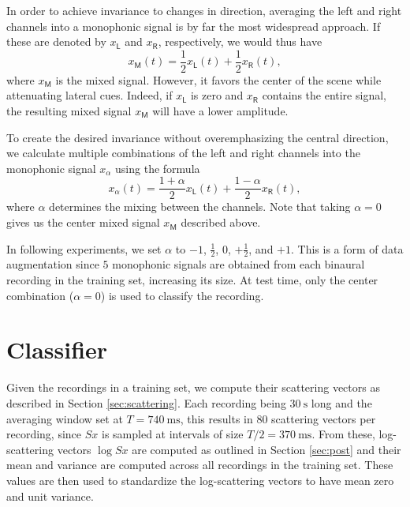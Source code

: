 \documentclass{article}
\begin{document}
\begin{sloppy}
In order to achieve invariance to changes in direction, averaging the left and right channels into a monophonic signal is by far the most widespread approach.  If these are denoted by $x_{\mathsf{L}}$ and $x_{\mathsf{R}}$, respectively, we would thus have
\begin{equation}
	x_{\mathsf{M}}(t) = \frac{1}{2} x_{\mathsf{L}}(t) + \frac{1}{2} x_{\mathsf{R}}(t),
\end{equation}
where $x_{\mathsf{M}}$ is the mixed signal. However, it favors the center of the scene while attenuating lateral cues. Indeed, if $x_{\mathsf{L}}$ is zero and $x_{\mathsf{R}}$ contains the entire signal, the resulting mixed signal $x_{\mathsf{M}}$ will have a lower amplitude.

To create the desired invariance without overemphasizing the central direction, we calculate multiple combinations of the left and right channels into the monophonic signal $x_{\alpha}$ using the formula
\begin{equation}
x_{\alpha}(t) =
\dfrac{1+\alpha}{2} x_{\mathsf{L}}(t) +
\dfrac{1-\alpha}{2} x_{\mathsf{R}}(t),
\end{equation}
where $\alpha$ determines the mixing between the channels. Note that taking $\alpha = 0$ gives us the center mixed signal $x_{\mathsf{M}}$ described above.

In following experiments, we set $\alpha$ to $-1$, $\frac{1}{2}$, $0$, $+\frac{1}{2}$, and $+1$. This is a form of data augmentation since $5$ monophonic signals are obtained from each binaural recording in the training set, increasing its size. At test time, only the center combination ($\alpha = 0$) is used to classify the recording.

\section{Classifier}
\label{sec:classifier}

Given the recordings in a training set, we compute their scattering vectors as described in Section \ref{sec:scattering}. Each recording being $30~\mathrm{s}$ long and the averaging window set at $T = 740~\mathrm{ms}$, this results in $80$ scattering vectors per recording, since $Sx$ is sampled at intervals of size $T/2 = 370~\mathrm{ms}$. From these, log-scattering vectors $\log Sx$ are computed as outlined in Section \ref{sec:post} and their mean and variance are computed across all recordings in the training set. These values are then used to standardize the log-scattering vectors to have mean zero and unit variance.


\end{sloppy}
\end{document}
